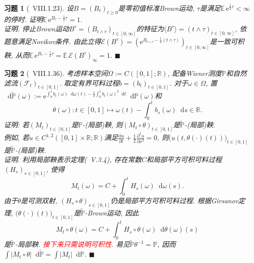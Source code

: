 \documentclass{ctexart}
\theoremstyle{definition}
\theoremstyle{remark}
\theoremstyle{plain}
\newtheorem{Ex}{习题}[section]
\newenvironment{Prf}{\vspace{1ex}\textbf{\\}{\color{red}\textit{证明}}.\normalfont}{\color{red}\hfill$\blacksquare$\vspace{1ex}\par}
\newcommand{\textred}[1]{\textcolor{red}{#1}}
\newcommand{\1}{\mathbbm{1}}				%
\renewcommand{\P}{\mathbb{P}}				%
\newcommand{\E}{\mathbb{E}}					%
\newcommand{\agp}[1]{\langle #1 \rangle}	%
\newcommand{\abs}[1]{\lvert#1\rvert}			%
\newcommand{\R}{\mathbb{R}}					%
\newcommand{\tint}{\textstyle\int\nolimits}
\renewcommand*{\d}{\mathop{}\!\mathrm{d}}	%
\newcommand{\pd}{\partial}					%
\newcommand{\p}[3][]{\frac{\pd^{#1}#2}{\pd{#3}^{#1}}}%
\newcommand{\e}{\mathrm{e}}
\begin{document}
\begin{Ex}[\cite{Revuz-Yor}~VIII.1.23]
设$B = (B_{t})_{t \ge 0}$是零初值标准Brown运动, $\tau$是满足$\E\,\e^{\frac{1}{2}\tau} < \infty$的停时. 证明$\E\,\e^{B_{\tau}-\frac{1}{2}\tau} = 1$.
\begin{Prf}
停止Brown运动$B^{\tau} = (B_{t\wedge\tau})_{t \in [0,\infty]}$的特征为$\agp{B^{\tau}} = (t\wedge\tau)_{t \in [0,\infty]}$, 依题意满足Novikov条件. 由此立得$\mathcal{E}(B^{\tau}) = (\e^{B_{t\wedge\tau}-\frac{1}{2}(t\wedge\tau)})_{t \in [0,\infty]}$是一致可积鞅, 从而$\E\,\e^{B_{\tau}-\frac{1}{2}\tau} = \E\,\mathcal{E}(B^{\tau})_{\infty} = 1$.
\end{Prf} 
\end{Ex}


\begin{Ex}[\cite{Revuz-Yor}~VIII.1.36]
考虑样本空间$\Omega := C([0,1];\R)$, 配备Wiener测度$\P$和自然滤流$(\mathscr{F}_{t})_{t \in [0,1]}$. 取定有界可料过程$b = (b_{t})_{t \in [0,1]}$. 对于$\omega\in\Omega$, 置$\d\tilde{\P}(\omega) := \e^{\int_{0}^{1} b_{t}(\omega) \d\omega(t) - \frac{1}{2}\int_{0}^{1} b_{t}(\omega)^{2} \d t} \d\P(\omega)$和
\[ \theta(\omega) : t \in [0,1] \mapsto \omega(t) - \tint_{0}^{t} b_{s}(\omega) \d s \in \R . \]
证明: 若$(M_{t})_{t \in [0,1]}$是$\P$-(局部)鞅, 则$(M_{t}\circ\theta)_{t \in [0,1]}$是$\tilde{\P}$-(局部)鞅. \\
例如, 若$u \in C^{1,2}([0,1]\times\R;\R)$满足$\p{u}{t} + \frac{1}{2}\p[2]{u}{x} = 0$, 则$\big( u(t,\theta(\bm{\cdot})(t)) \big)_{t \in [0,1]}$是$\tilde{\P}$-(局部)鞅.
\begin{Prf}
利用局部鞅表示定理(\cite{Revuz-Yor}~V.3.4), 存在常数$C$和局部平方可积可料过程$(H_{s})_{s \in [0,1]}$, 使得
\[ M_{t}(\omega) = C + \tint_{0}^{t} H_{s}(\omega) \d\omega(s) . \]
由于$\theta$是可测双射, $(H_{s}\circ\theta)_{s \in [0,1]}$仍是局部平方可积可料过程. 
根据Girsanov定理, $\big(\theta(\bm{\cdot})(t)\big)_{t \in [0,1]}$是$\tilde{\P}$-Brown运动, 因此
\[ M_{t}\circ\theta(\omega) = C + \tint_{0}^{t} H_{s}\circ\theta(\omega) \d\theta(\omega)(s) \]
是$\tilde{\P}$-局部鞅. \textred{接下来只需说明可积性.} 易见$\tilde{\P}\theta^{-1} = \P$, 因而$\int \abs{M_{t}\circ\theta} \d\tilde{\P} = \int \abs{M_{t}} \d\P$.
\end{Prf}
\end{Ex}
\end{document}
